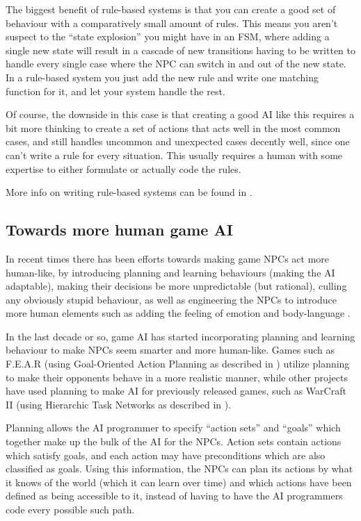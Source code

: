 The biggest benefit of rule-based systems is that you can create a good set of
behaviour with a comparatively small amount of rules. This means you aren't
suspect to the ``state explosion'' you might have in an FSM, where adding a
single new state will result in a cascade of new transitions having to be
written to handle every single case where the NPC can switch in and out of the
new state. In a rule-based system you just add the new rule and write one
matching function for it, and let your system handle the rest.

Of course, the downside in this case is that creating a good AI like this
requires a bit more thinking to create a set of actions that acts well in the
most common cases, and still handles uncommon and unexpected cases decently
well, since one can't write a rule for every situation. This usually requires a
human with some expertise to either formulate or actually code the rules.

More info on writing rule-based systems can be found in
\citet[chap.~4]{kirby2011introduction}.

\subsection{Towards more human game AI}
\label{sec:towards-more-human}

In recent times there has been efforts towards making game NPCs act more
human-like, by introducing planning and learning behaviours (making the AI
adaptable), making their decisions be more unpredictable (but rational), culling
any obviously stupid behaviour, as well as engineering the NPCs to introduce
more human elements such as adding the feeling of emotion and body-language
\citep{spronck2005adaptive}.

In the last decade or so, game AI has started incorporating planning and
learning behaviour to make NPCs seem smarter and more human-like. Games such as
F.E.A.R (using Goal-Oriented Action Planning as described in
\citet{orkin2006three}) utilize planning to make their opponents behave in a
more realistic manner, while other projects have used planning to make AI for
previously released games, such as WarCraft II (using Hierarchic Task Networks
as described in \citet{brickmanhtn}).

Planning allows the AI programmer to specify ``action sets'' and ``goals'' which
together make up the bulk of the AI for the NPCs. Action sets contain actions
which satisfy goals, and each action may have preconditions which are also
classified as goals. Using this information, the NPCs can plan its actions by
what it knows of the world (which it can learn over time) and which actions have
been defined as being accessible to it, instead of having to have the AI
programmers code every possible such path.

